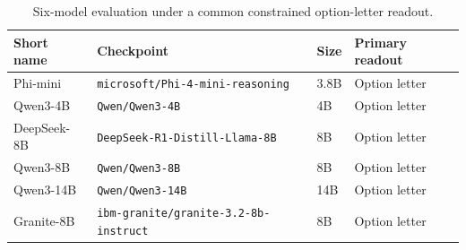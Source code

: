 \begin{table}[t]
\centering
\caption{Six-model evaluation under a common constrained option-letter readout.}
\label{tab:models}
\small
\setlength{\tabcolsep}{3.5pt}
\begin{tabular}{llll}
\toprule
Short name & Checkpoint & Size & Primary readout \\
\midrule
Phi-mini & \texttt{microsoft/Phi-4-mini-reasoning} & 3.8B & Option letter \\
Qwen3-4B & \texttt{Qwen/Qwen3-4B} & 4B & Option letter \\
DeepSeek-8B & \texttt{DeepSeek-R1-Distill-Llama-8B} & 8B & Option letter \\
Qwen3-8B & \texttt{Qwen/Qwen3-8B} & 8B & Option letter \\
Qwen3-14B & \texttt{Qwen/Qwen3-14B} & 14B & Option letter \\
Granite-8B & \texttt{ibm-granite/granite-3.2-8b-instruct} & 8B & Option letter \\
\bottomrule
\end{tabular}
\end{table}
